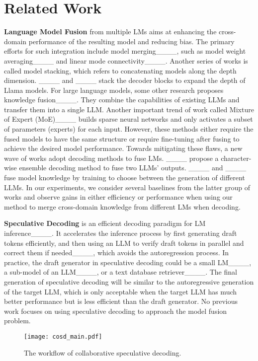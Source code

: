 \section{Related Work}
\textbf{Language Model Fusion} from multiple LMs aims at enhancing the cross-domain performance of the resulting model and reducing bias. The primary efforts for such integration include model merging____, such as model weight averaging____ and linear mode connectivity____. Another series of works is called model stacking, which refers to concatenating models along the depth dimension. ____ and ____ stack the decoder blocks to expand the depth of Llama models. For large language models, some other research proposes knowledge fusion____. They combine the capabilities of existing LLMs and transfer them into a single LLM. Another important trend of work called Mixture of Expert (MoE)____ builds sparse neural networks and only activates a subset of parameters (\ie experts) for each input. However, these methods either require the fused models to have the same structure or require fine-tuning after fusing to achieve the desired model performance. Towards mitigating these flaws, a new wave of works adopt decoding methods to fuse LMs. ____ propose a character-wise ensemble decoding method to fuse two LLMs' outputs. ____ and ____ fuse model knowledge by training to choose between the generation of different LLMs. In our experiments, we consider several baselines from the latter group of works and observe gains in either efficiency or performance when using our method to merge cross-domain knowledge from different LMs when decoding.

\textbf{Speculative Decoding} is an efficient decoding paradigm for LM inference____. It accelerates the inference process by first generating draft tokens efficiently, and then using an LLM to verify draft tokens in parallel and correct them if needed____, which avoids the autoregression process. In practice, the draft generator in speculative decoding could be a small LM____, a sub-model of an LLM____, or a text database retriever____. The final generation of speculative decoding will be similar to the autoregressive generation of the target LLM, which is only acceptable when the target LLM has much better performance but is less efficient than the draft generator. No previous work focuses on using speculative decoding to approach the model fusion problem.

\begin{figure*}[t]
    \centering  \texttt{[image: cosd\_main.pdf]}
    \vspace{-5mm}
    \caption{The workflow of collaborative speculative decoding.}
    \label{fig_main}
\end{figure*}